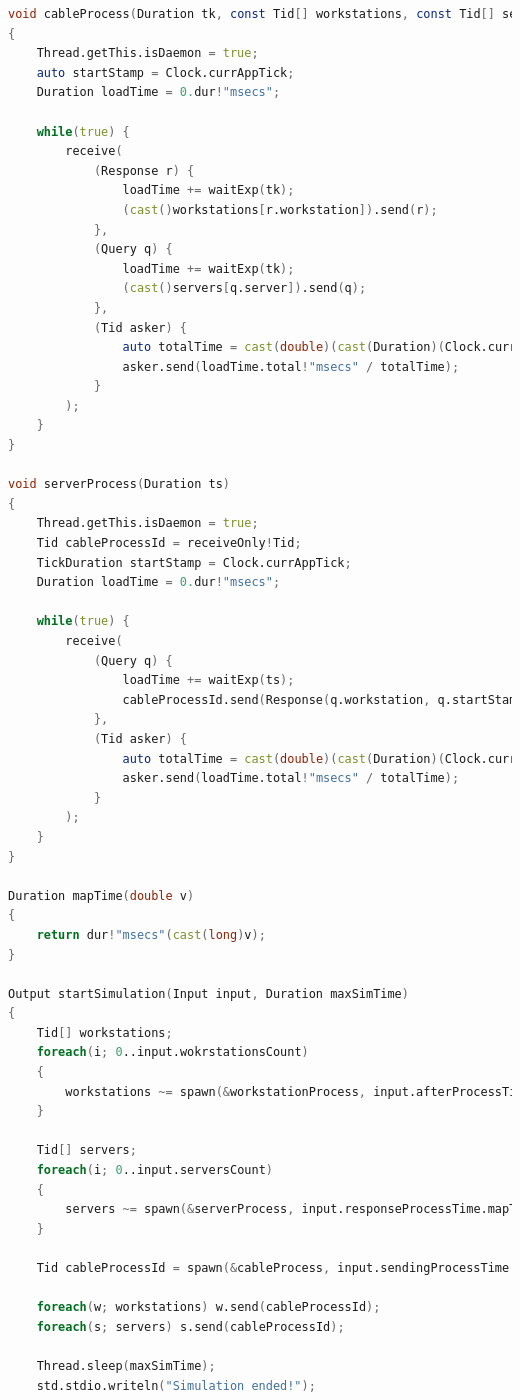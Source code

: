 \documentclass[russian,utf8,emptystyle]{eskdtext}
\begin{document}
\begin{lstlisting}[language=D]
void cableProcess(Duration tk, const Tid[] workstations, const Tid[] servers)
{
    Thread.getThis.isDaemon = true;
    auto startStamp = Clock.currAppTick;
    Duration loadTime = 0.dur!"msecs";
    
    while(true) {
        receive(
            (Response r) {
                loadTime += waitExp(tk);
                (cast()workstations[r.workstation]).send(r);
            },
            (Query q) {
                loadTime += waitExp(tk);
                (cast()servers[q.server]).send(q);
            },
            (Tid asker) {
                auto totalTime = cast(double)(cast(Duration)(Clock.currAppTick - startStamp)).total!"msecs";
                asker.send(loadTime.total!"msecs" / totalTime);
            }
        );
    }
}

void serverProcess(Duration ts)
{
    Thread.getThis.isDaemon = true;
    Tid cableProcessId = receiveOnly!Tid;
    TickDuration startStamp = Clock.currAppTick;
    Duration loadTime = 0.dur!"msecs";
    
    while(true) {
        receive(
            (Query q) {
                loadTime += waitExp(ts);
                cableProcessId.send(Response(q.workstation, q.startStamp));
            },
            (Tid asker) {
                auto totalTime = cast(double)(cast(Duration)(Clock.currAppTick - startStamp)).total!"msecs";
                asker.send(loadTime.total!"msecs" / totalTime);
            }
        );
    }
}
    
Duration mapTime(double v)
{
    return dur!"msecs"(cast(long)v);
}

Output startSimulation(Input input, Duration maxSimTime)
{
    Tid[] workstations;
    foreach(i; 0..input.wokrstationsCount)
    {
        workstations ~= spawn(&workstationProcess, input.afterProcessTime.mapTime, input.queringProcessTime.mapTime, i, input.serversCount);
    }
    
    Tid[] servers;
    foreach(i; 0..input.serversCount)
    {
        servers ~= spawn(&serverProcess, input.responseProcessTime.mapTime);
    }
    
    Tid cableProcessId = spawn(&cableProcess, input.sendingProcessTime.mapTime, cast(immutable)workstations, cast(immutable)servers);
    
    foreach(w; workstations) w.send(cableProcessId);
    foreach(s; servers) s.send(cableProcessId);
    
    Thread.sleep(maxSimTime);
    std.stdio.writeln("Simulation ended!");
    

\end{lstlisting}
\end{document}
